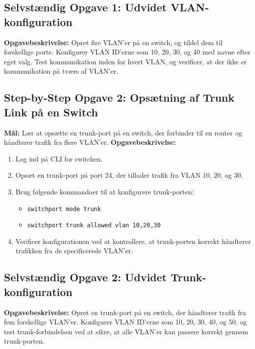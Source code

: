 \subsection*{Selvstændig Opgave 1: Udvidet VLAN-konfiguration}
\textbf{Opgavebeskrivelse:} Opret fire VLAN'er på en switch, og tildel dem til forskellige porte. Konfigurer VLAN ID'erne som 10, 20, 30, og 40 med navne efter eget valg. Test kommunikation inden for hvert VLAN, og verificer, at der ikke er kommunikation på tværs af VLAN'er.

\subsection*{Step-by-Step Opgave 2: Opsætning af Trunk Link på en Switch}
\textbf{Mål:} Lær at opsætte en trunk-port på en switch, der forbinder til en router og håndterer trafik fra flere VLAN'er.
\newline\newline\noindent
\textbf{Opgavebeskrivelse:}
\begin{enumerate}
	\item Log ind på CLI for switchen.
	\item Opsæt en trunk-port på port 24, der tillader trafik fra VLAN 10, 20, og 30.
	\item Brug følgende kommandoer til at konfigurere trunk-porten:
	\begin{itemize}
		\item \texttt{switchport mode trunk}
		\item \texttt{switchport trunk allowed vlan 10,20,30}
	\end{itemize}
	\item Verificer konfigurationen ved at kontrollere, at trunk-porten korrekt håndterer trafikken fra de specificerede VLAN'er.
\end{enumerate}

\subsection*{Selvstændig Opgave 2: Udvidet Trunk-konfiguration}
\textbf{Opgavebeskrivelse:} Opret en trunk-port på en switch, der håndterer trafik fra fem forskellige VLAN'er. Konfigurer VLAN ID'erne som 10, 20, 30, 40, og 50, og test trunk-forbindelsen ved at sikre, at alle VLAN'er kan passere korrekt gennem trunk-porten.

